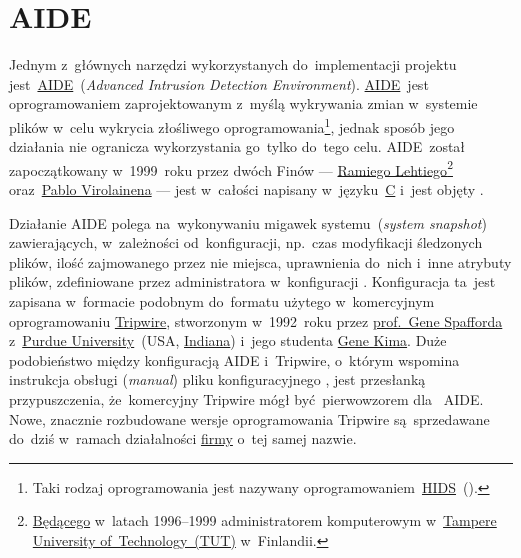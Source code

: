 \documentclass[thesis]{subfiles}
\begin{document}
\section{AIDE}
\label{sec:aide}

Jednym z~głównych narzędzi wykorzystanych do~implementacji projektu jest~\href{http://aide.sourceforge.net/}{AIDE}~(\emph{Advanced Intrusion Detection Environment}). \href{https://wiki.archlinux.org/index.php/AIDE}{AIDE}~jest oprogramowaniem zaprojektowanym z~myślą wykrywania zmian w~systemie plików w~celu wykrycia złośliwego oprogramowania\footnote{Taki rodzaj oprogramowania jest nazywany oprogramowaniem~\href{https://en.wikipedia.org/wiki/Host-based_intrusion_detection_system_comparison}{HIDS}~().}, jednak sposób jego działania nie ogranicza wykorzystania go~tylko do~tego celu. AIDE~został zapoczątkowany w~1999~roku przez dwóch Finów --- \href{http://www.ipi.fi/~rammer/cv.html}{Ramiego Lehtiego}\footnote{\href{http://www.ipi.fi/~rammer/cv.html}{Będącego} w~latach 1996--1999 administratorem komputerowym w~\href{http://www.tut.fi/en}{Tampere University of~Technology~(TUT)} w~Finlandii.} oraz~\href{https://www.linkedin.com/in/pablo-virolainen-73501731/}{Pablo Virolainena} --- jest w~całości napisany w~języku~\href{https://en.wikipedia.org/wiki/C_(programming_language)}{C} i~jest objęty .

Działanie AIDE polega na~wykonywaniu migawek systemu~(\emph{system snapshot}) zawierających, w~zależności od~konfiguracji, np.~czas modyfikacji śledzonych plików, ilość zajmowanego przez nie miejsca, uprawnienia do~nich i~inne atrybuty plików, zdefiniowane przez administratora w~konfiguracji \href{https://linux.die.net/man/5/aide.conf}{}. Konfiguracja ta~jest zapisana w~formacie podobnym do~formatu użytego w~komercyjnym oprogramowaniu \href{https://en.wikipedia.org/wiki/Open_Source_Tripwire}{Tripwire}, stworzonym w~1992~roku przez \href{https://en.wikipedia.org/wiki/Gene_Spafford}{prof.~Gene Spafforda} z~\href{https://en.wikipedia.org/wiki/Purdue_University}{Purdue University}~(USA, \href{https://en.wikipedia.org/wiki/Indiana}{Indiana}) i~jego studenta \href{https://en.wikipedia.org/wiki/Gene_Kim}{Gene Kima}. Duże podobieństwo między konfiguracją AIDE i~Tripwire, o~którym wspomina instrukcja obsługi (\emph{\gls{manual}}) pliku konfiguracyjnego , jest przesłanką przypuszczenia, że~komercyjny Tripwire mógł być~pierwowzorem dla~ AIDE. Nowe, znacznie rozbudowane wersje oprogramowania Tripwire są~sprzedawane do~dziś w~ramach działalności \href{https://en.wikipedia.org/wiki/Tripwire_(company)}{firmy} o~tej samej nazwie.
\end{document}
